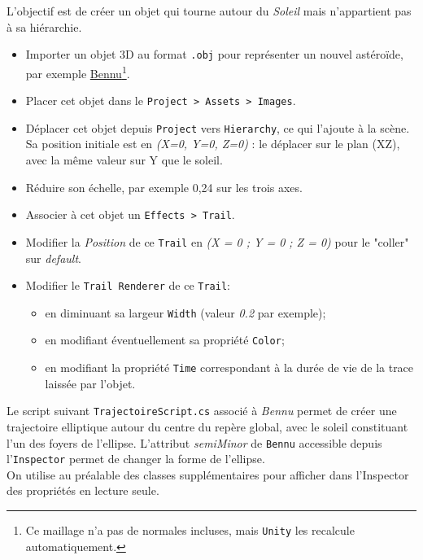\documentclass[a4paper,10pt]{article}
\newenvironment{solution}%
{\begin{tcolorbox}[breakable,colback=red!5!white,colframe=red!75!black,title=Solution]}%
{\end{tcolorbox}}
\begin{document}
\ifversionenseignant
\begin{solution}
L'objectif est de créer un objet qui tourne autour du \textit{Soleil} mais n'appartient pas à sa hiérarchie.

\begin{itemize}
	\item Importer un objet 3D au format \texttt{.obj} pour représenter un nouvel astéroïde, par exemple \href{https://nasa3d.arc.nasa.gov/detail/bennu}{Bennu}\footnote{Ce maillage n'a pas de normales incluses, mais \texttt{Unity} les recalcule automatiquement.}.
	\item Placer cet objet dans le \texttt{Project > Assets > Images}.
	\item Déplacer cet objet depuis \texttt{Project} vers \texttt{Hierarchy}, ce qui l'ajoute à la scène. Sa position initiale est en \textit{(X=0, Y=0, Z=0)} : le déplacer sur le plan (XZ), avec la même valeur sur Y que le soleil.
	\item Réduire son échelle, par exemple 0,24 sur les trois axes.
	\item Associer à cet objet  un \texttt{Effects > Trail}. 
	\item Modifier la \textit{Position} de ce \texttt{Trail} en \textit{(X = 0 ; Y = 0 ; Z = 0)} pour le "coller" sur \textit{default}.
	\item Modifier le \texttt{Trail Renderer} de ce \texttt{Trail}:
	\begin{itemize}
		\item en diminuant sa largeur \texttt{Width} (valeur \textit{0.2} par exemple);
		\item en modifiant éventuellement sa propriété \texttt{Color};
		\item en modifiant la propriété \texttt{Time} correspondant à la durée de vie de la trace laissée par l'objet.
	\end{itemize}
\end{itemize}

Le script suivant \texttt{TrajectoireScript.cs} associé à \textit{Bennu} permet de créer une trajectoire elliptique autour du centre du repère global, avec le soleil constituant l'un des foyers de l'ellipse. L'attribut \textit{semiMinor}  de \texttt{Bennu} accessible depuis l'\texttt{Inspector} permet de changer la forme de l'ellipse. \\

On utilise au préalable des classes supplémentaires pour afficher dans l'Inspector des propriétés en lecture seule.


\end{solution}
\end{document}
